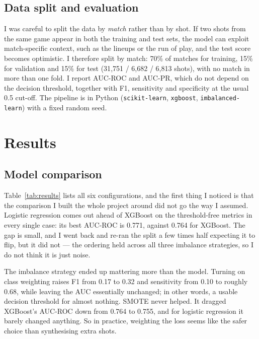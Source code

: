 \documentclass[journal]{vgtc}                %
\begin{document}
\subsection{Data split and evaluation}
I was careful to split the data by \emph{match} rather than by shot. If
two shots from the same game appear in both the training and test sets,
the model can exploit match-specific context, such as the lineups or the
run of play, and the test score becomes optimistic. I therefore split by
match: 70\% of matches for training, 15\% for validation and 15\% for test
(31{,}751 / 6{,}682 / 6{,}813 shots), with no match in more than one fold.
I report AUC-ROC and AUC-PR, which do not depend on the decision threshold,
together with F1, sensitivity and specificity at the usual 0.5 cut-off.
The pipeline is in Python
(\texttt{scikit-learn}, \texttt{xgboost}, \texttt{imbalanced-learn}) with
a fixed random seed.

\section{Results}

\subsection{Model comparison}
Table~\ref{tab:results} lists all six configurations, and the first thing
I noticed is that the comparison I built the whole project around did not
go the way I assumed. Logistic regression comes out ahead of XGBoost on
the threshold-free metrics in every single case: its best AUC-ROC is
0.771, against 0.764 for XGBoost. The gap is small, and I went back and
re-ran the split a few times half expecting it to flip, but it did not
--- the ordering held across all three imbalance strategies, so I do not
think it is just noise.

The imbalance strategy ended up mattering more than the model. Turning on
class weighting raises F1 from 0.17 to 0.32 and sensitivity from 0.10 to
roughly 0.68, while leaving the AUC essentially unchanged; in other
words, a usable decision threshold for almost nothing. SMOTE never
helped. It dragged XGBoost's AUC-ROC down from 0.764 to 0.755, and for
logistic regression it barely changed anything. So in practice, weighting
the loss seems like the safer choice than synthesising extra shots.
\end{document}

